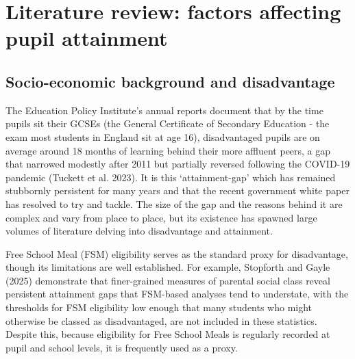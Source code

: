 \documentclass[
  12pt,
  titlepage]{article}
\begin{document}
\section{Literature review: factors affecting pupil
attainment}\label{literature-review-factors-affecting-pupil-attainment}

\subsection{Socio-economic background and
disadvantage}\label{socio-economic-background-and-disadvantage}

The Education Policy Institute's annual reports document that by the
time pupils sit their GCSEs (the General Certificate of Secondary
Education - the exam most students in England sit at age 16),
disadvantaged pupils are on average around 18 months of learning behind
their more affluent peers, a gap that narrowed modestly after 2011 but
partially reversed following the COVID-19 pandemic (Tuckett et al.
2023). It is this `attainment-gap' which has remained stubbornly
persistent for many years and that the recent government white paper has
resolved to try and tackle. The size of the gap and the reasons behind
it are complex and vary from place to place, but its existence has
spawned large volumes of literature delving into disadvantage and
attainment.

Free School Meal (FSM) eligibility serves as the standard proxy for
disadvantage, though its limitations are well established. For example,
Stopforth and Gayle (2025) demonstrate that finer-grained measures of
parental social class reveal persistent attainment gaps that FSM-based
analyses tend to understate, with the thresholds for FSM eligibility low
enough that many students who might otherwise be classed as
disadvantaged, are not included in these statistics. Despite this,
because eligibility for Free School Meals is regularly recorded at pupil
and school levels, it is frequently used as a proxy.
\end{document}
